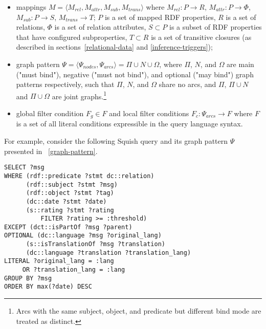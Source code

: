 \documentclass[conference,letterpaper]{IEEEtran}
\begin{document}
\begin{itemize}

\item mappings $M = \langle M_{rel}, M_{attr}, M_{sub}, M_{trans}
\rangle$ where $M_{rel}: P \to R$, $M_{attr}: P \to \Phi$, $M_{sub}: P
\to S$, $M_{trans} \to T$; $P$ is a set of mapped RDF properties, $R$ is
a set of relations, $\Phi$ is a set of relation attributes, $S \subset
P$ is a subset of RDF properties that have configured subproperties, $T
\subset R$ is a set of transitive closures (as described in
sections~\ref{relational-data} and \ref{inference-triggers});

\item graph pattern $\Psi = \langle \Psi_{nodes}, \Psi_{arcs} \rangle =
\Pi \cup N \cup \Omega$, where $\Pi$, $N$, and $\Omega$ are main ("must
bind"), negative ("must not bind"), and optional ("may bind") graph
patterns respectively, such that $\Pi$, $N$, and $\Omega$ share no arcs,
and $\Pi$, $\Pi \cup N$ and $\Pi \cup \Omega$ are joint
graphs.\footnote{Arcs with the same subject, object, and predicate but
different bind mode are treated as distinct.}

\item global filter condition $F_g \in F$ and local filter conditions
$F_c: \Psi_{arcs} \to F$ where $F$ is a set of all literal conditions
expressible in the query language syntax.

\end{itemize}

For example, consider the following Squish query and its graph pattern
$\Psi$ presented in \figurename~\ref{graph-pattern}.

\begin{Verbatim}[fontsize=\scriptsize]
SELECT ?msg
WHERE (rdf::predicate ?stmt dc::relation)
      (rdf::subject ?stmt ?msg)
      (rdf::object ?stmt ?tag)
      (dc::date ?stmt ?date)
      (s::rating ?stmt ?rating
          FILTER ?rating >= :threshold)
EXCEPT (dct::isPartOf ?msg ?parent)
OPTIONAL (dc::language ?msg ?original_lang)
      (s::isTranslationOf ?msg ?translation)
      (dc::language ?translation ?translation_lang)
LITERAL ?original_lang = :lang
     OR ?translation_lang = :lang
GROUP BY ?msg
ORDER BY max(?date) DESC
\end{Verbatim}
\end{document}
